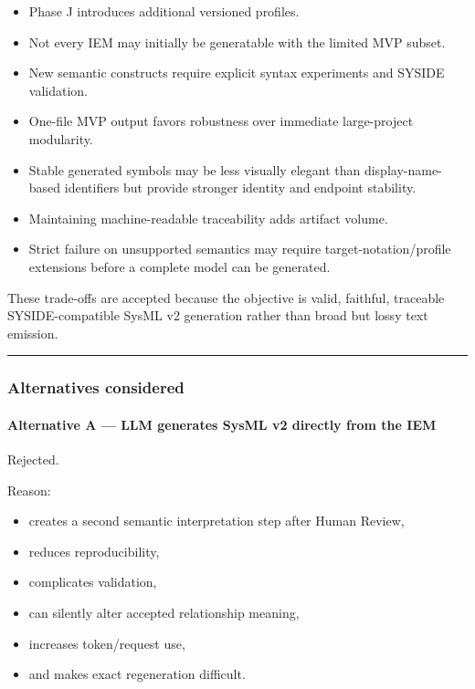 \begin{itemize}
\tightlist
\item
  Phase J introduces additional versioned profiles.
\item
  Not every IEM may initially be generatable with the limited MVP subset.
\item
  New semantic constructs require explicit syntax experiments and SYSIDE validation.
\item
  One-file MVP output favors robustness over immediate large-project modularity.
\item
  Stable generated symbols may be less visually elegant than display-name-based identifiers but provide stronger identity and endpoint stability.
\item
  Maintaining machine-readable traceability adds artifact volume.
\item
  Strict failure on unsupported semantics may require target-notation/profile extensions before a complete model can be generated.
\end{itemize}

These trade-offs are accepted because the objective is valid, faithful, traceable SYSIDE-compatible SysML v2 generation rather than broad but lossy text emission.

\begin{center}\rule{0.5\linewidth}{0.5pt}\end{center}

\hypertarget{alternatives-considered}{%
\subsubsection{Alternatives considered}\label{alternatives-considered}}

\hypertarget{alternative-a--llm-generates-sysml-v2-directly-from-the-iem}{%
\paragraph{Alternative A --- LLM generates SysML v2 directly from the IEM}\label{alternative-a--llm-generates-sysml-v2-directly-from-the-iem}}

Rejected.

Reason:

\begin{itemize}
\tightlist
\item
  creates a second semantic interpretation step after Human Review,
\item
  reduces reproducibility,
\item
  complicates validation,
\item
  can silently alter accepted relationship meaning,
\item
  increases token/request use,
\item
  and makes exact regeneration difficult.
\end{itemize}

